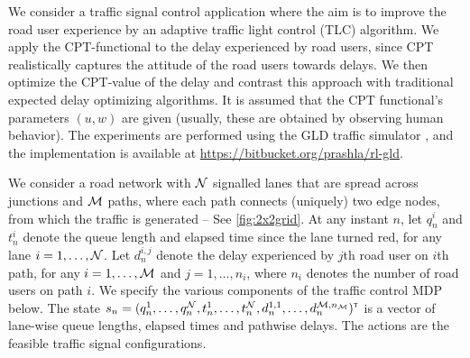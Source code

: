 We consider a traffic signal control application where the aim is to improve the road user experience by an adaptive traffic light control (TLC) algorithm.
We apply the CPT-functional to the delay experienced by road users, since CPT realistically captures the attitude of the road users towards delays. We then optimize the CPT-value of the delay and contrast this approach with traditional expected delay optimizing algorithms. It is assumed that the CPT functional's parameters $(u,w)$ are given (usually, these are obtained by observing human behavior). The experiments are performed using the GLD traffic simulator \cite{GLDSim}, and the implementation is available at \url{https://bitbucket.org/prashla/rl-gld}.

We consider a road network with $\mathcal{N}$ signalled lanes that are spread across junctions and $\mathcal{M}$ paths, where each path connects (uniquely) two edge nodes, from which the traffic is generated -- See \cref{fig:2x2grid}. 
At any instant $n$, let $q_n^i$ and $t_n^i$ denote the queue length and elapsed time since the lane turned red, for any lane $i = 1,\ldots, \mathcal{N}$. Let $d_n^{i,j}$ denote the delay experienced by $j$th road user on $i$th path, for any $i=1,\ldots,\mathcal{M}$ and $j=1,\ldots,n_i$, where $n_i$ denotes the number of road users on path $i$.
We specify the various components of the traffic control MDP below.
The state $s_n=(q_n^1,\ldots,q_n^{\mathcal{N}},t_n^1,\ldots,t_n^{\mathcal{N}},d_n^{1,1},\ldots,d_n^{\mathcal{M},n_{\mathcal{M}}})^\mathsf{\scriptscriptstyle T}$ is a vector of lane-wise queue lengths, elapsed times and pathwise delays.
The actions are the feasible traffic signal configurations. 


